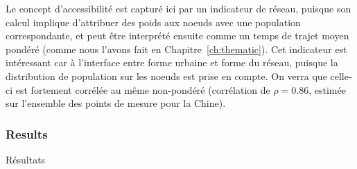 Le concept d'accessibilité est capturé ici par un indicateur de réseau, puisque son calcul implique d'attribuer des poids aux noeuds avec une population correspondante, et peut être interprété ensuite comme un temps de trajet moyen pondéré (comme nous l'avons fait en Chapitre~\ref{ch:thematic}). Cet indicateur est intéressant car à l'interface entre forme urbaine et forme du réseau, puisque la distribution de population sur les noeuds est prise en compte. On verra que celle-ci est fortement corrélée au même non-pondéré (corrélation de $\rho = 0.86$, estimée sur l'ensemble des points de mesure pour la Chine).








\subsubsection{Results}{Résultats}



